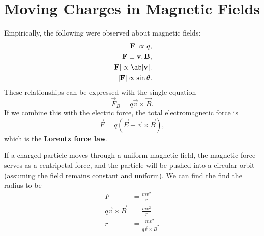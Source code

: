 \chapter{Moving Charges in Magnetic Fields}

Empirically, the following were observed about magnetic fields:
\begin{subequations}
    \begin{align}
        |\vec{F}| \propto q, \\
        \vec{F} \perp \vec{v}, \vec{B}, \\
        |\vec{F}| \propto \ab|\vec{v}|. \\
        |\vec{F}| \propto \sin\theta. \\
    \end{align}
\end{subequations}
These relationships can be expressed with the single equation
\begin{equation}
    \vec{F}_B = q \vec{v} \times \vec{B}.
\end{equation}
If we combine this with the electric force, the total electromagnetic force is
\begin{equation}
    \vec{F} = q (\vec{E} + \vec{v} \times \vec{B}),
\end{equation}
which is the \textbf{Lorentz force law}.

If a charged particle moves through a uniform magnetic field,
the magnetic force serves as a centripetal force,
and the particle will be pushed into a circular orbit
(assuming the field remains constant and uniform).
We can find the find the radius to be
\begin{equation}
    \begin{aligned}
        F &= \frac{m v^2}{r} \\
        q \vec{v} \times \vec{B} &= \frac{m v^2}{r} \\
        r &= \frac{m v^2}{q \vec{v} \times \vec{B}}.
    \end{aligned}
\end{equation}
